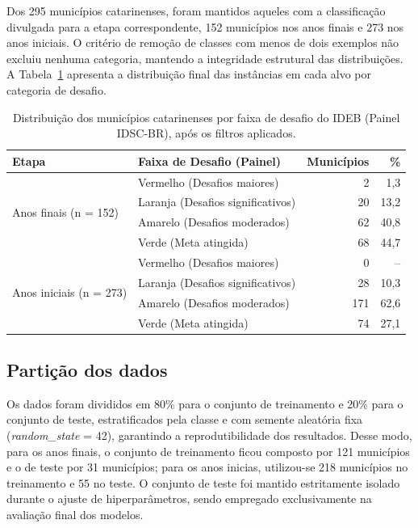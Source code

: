 Dos 295 municípios catarinenses, foram mantidos aqueles com a classificação divulgada para a etapa correspondente, 152 municípios nos anos finais e 273 nos anos iniciais. O critério de remoção de classes com menos de dois exemplos não excluiu nenhuma categoria, mantendo a integridade estrutural das distribuições. A Tabela~\ref{tab:distribuicao-classes} apresenta a distribuição final das instâncias em cada alvo por categoria de desafio.

\begin{table}[htbp]
	\centering
	\caption{Distribuição dos municípios catarinenses por faixa de desafio do IDEB (Painel IDSC-BR), após os filtros aplicados.}
	\label{tab:distribuicao-classes}
	\begin{tabular}{llrr}
		\toprule
		\textbf{Etapa} & \textbf{Faixa de Desafio (Painel)} & \textbf{Municípios} & \textbf{\%} \\
		\midrule
		\multirow{4}{*}{Anos finais (n = 152)}
		& Vermelho (Desafios maiores)       & 2   & 1,3 \\
		& Laranja (Desafios significativos) & 20  & 13,2 \\
		& Amarelo (Desafios moderados)     & 62  & 40,8 \\
		& Verde (Meta atingida)            & 68  & 44,7 \\
		\midrule
		\multirow{4}{*}{Anos iniciais (n = 273)}
		& Vermelho (Desafios maiores)       & 0   & -- \\
		& Laranja (Desafios significativos) & 28  & 10,3 \\
		& Amarelo (Desafios moderados)     & 171 & 62,6 \\
		& Verde (Meta atingida)            & 74  & 27,1 \\
		\bottomrule
	\end{tabular}
\end{table}
\subsection{Partição dos dados}

Os dados foram divididos em 80\% para o conjunto de treinamento e 20\% para o conjunto de teste, estratificados pela classe e com semente aleatória fixa (\textit{random\_state} = 42), garantindo a reprodutibilidade dos resultados. Desse modo, para os anos finais, o conjunto de treinamento ficou composto por 121 municípios e o de teste por 31 municípios; para os anos inicias, utilizou-se 218 municípios no treinamento e 55 no teste. O conjunto de teste foi mantido estritamente isolado durante o ajuste de hiperparâmetros, sendo empregado exclusivamente na avaliação final dos modelos.

